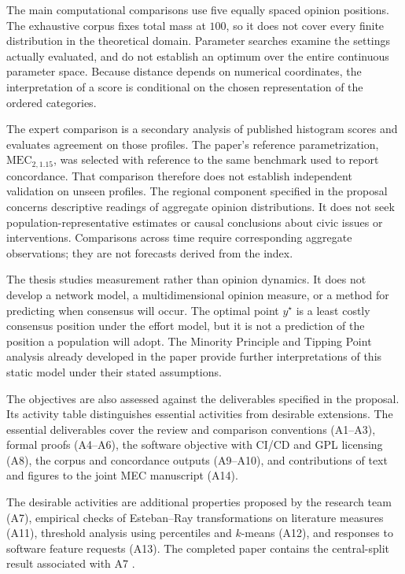 \documentclass{article}
\theoremstyle{plain}
\theoremstyle{remark}
\begin{document}
The main computational comparisons use five equally spaced opinion positions. The exhaustive corpus fixes total mass at $100$, so it does not cover every finite distribution in the theoretical domain. Parameter searches examine the settings actually evaluated, and do not establish an optimum over the entire continuous parameter space. Because distance depends on numerical coordinates, the interpretation of a score is conditional on the chosen representation of the ordered categories.

The expert comparison is a secondary analysis of published histogram scores and evaluates agreement on those profiles. The paper's reference parametrization, $\mathrm{MEC}_{2,1.15}$, was selected with reference to the same benchmark used to report concordance. That comparison therefore does not establish independent validation on unseen profiles. The regional component specified in the proposal concerns descriptive readings of aggregate opinion distributions. It does not seek population-representative estimates or causal conclusions about civic issues or interventions. Comparisons across time require corresponding aggregate observations; they are not forecasts derived from the index.

The thesis studies measurement rather than opinion dynamics. It does not develop a network model, a multidimensional opinion measure, or a method for predicting when consensus will occur. The optimal point $y^\star$ is a least costly consensus position under the effort model, but it is not a prediction of the position a population will adopt. The Minority Principle and Tipping Point analysis already developed in the paper provide further interpretations of this static model under their stated assumptions.

The objectives are also assessed against the deliverables specified in the proposal. Its activity table distinguishes essential activities from desirable extensions. The essential deliverables cover the review and comparison conventions (A1--A3), formal proofs (A4--A6), the software objective with CI/CD and GPL licensing (A8), the corpus and concordance outputs (A9--A10), and contributions of text and figures to the joint MEC manuscript (A14).

The desirable activities are additional properties proposed by the research team (A7), empirical checks of Esteban--Ray transformations on literature measures (A11), threshold analysis using percentiles and $k$-means (A12), and responses to software feature requests (A13). The completed paper contains the central-split result associated with A7 \citep{aranda2026mec}.
\end{document}
